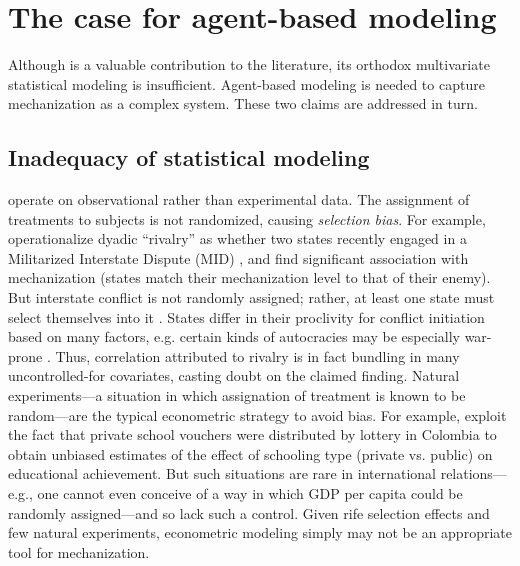 \documentclass{article}
\begin{document}
\section{The case for agent-based modeling}

Although \citet{sechser2010army} is a valuable contribution to the literature,
its orthodox multivariate statistical modeling is insufficient. Agent-based
modeling is needed to capture mechanization as a complex system. These two
claims are addressed in turn. 

\subsection{Inadequacy of statistical modeling}

\citet{sechser2010army} operate on observational rather than experimental
data. The assignment of treatments to subjects is not randomized, causing
\textit{selection bias}. For example, \citet{sechser2010army} operationalize
dyadic ``rivalry'' as whether two states recently engaged in a Militarized
Interstate Dispute (MID) \citep{cow_midb}, and find significant association with mechanization
(states match their mechanization level to that of their enemy). But interstate
conflict is not randomly assigned; rather, at least one state must select
themselves into it \citep{fearon2002selection}. States differ in their
proclivity for conflict initiation based on many factors, e.g. certain kinds of autocracies may be
especially war-prone \citep{de1995war}. Thus, correlation attributed to rivalry is in fact
bundling in many uncontrolled-for covariates, casting doubt on the claimed
finding. Natural experiments---a situation in which assignation of treatment is
known to be random---are the typical econometric strategy to avoid bias. For
example, \citet{angrist2002vouchers} exploit the fact that private school
vouchers were distributed by lottery in Colombia to obtain unbiased estimates of
the effect of schooling type (private vs. public) on educational achievement.
But such situations are rare in international relations---e.g., one cannot
even conceive of a way in which GDP per capita could be randomly assigned---and so
\cite{sechser2010army} lack such a control. Given rife selection effects and few
natural experiments, econometric modeling simply may not be an appropriate tool for mechanization. 
\end{document}

